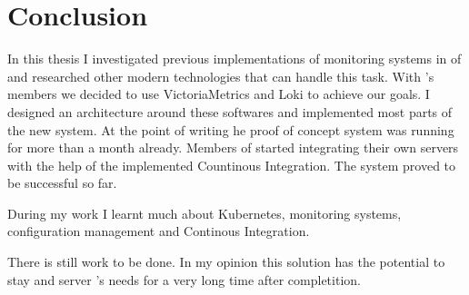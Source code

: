\chapter{Conclusion \label{ch8}}

In this thesis I investigated previous implementations of monitoring systems in
\kszkfull of \schfull and researched other modern technologies that can handle
this task. With \kszk's members we decided to use VictoriaMetrics and Loki to
achieve our goals. I designed an architecture around these softwares and
implemented most parts of the new system. At the point of writing he proof of
concept system was running for more than a month already. Members of \kszk
started integrating their own servers with the help of the implemented
Countinous Integration. The system proved to be successful so far.

During my work I learnt much about Kubernetes, monitoring systems,
configuration management and Continous Integration.

There is still work to be done. In my opinion this solution has the potential
to stay and server \kszk's needs for a very long time after completition.

